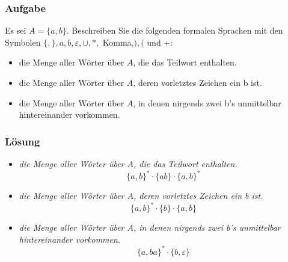 \begin{frame}
	\frametitle{Aufgabe }
	Es sei $A = \{a, b\}$. Beschreiben Sie die folgenden formalen Sprachen mit den Symbolen $\{, \}, a, b,
\varepsilon, \cup, \ast,$ Komma,$ ), ($ und $+$:
	\begin{itemize}
		\item die Menge aller Wörter über $A$, die das Teilwort  enthalten.
		\item die Menge aller Wörter über $A$, deren vorletztes Zeichen ein b ist.
		\item die Menge aller Wörter über $A$, in denen nirgends zwei b’s unmittelbar hintereinander vorkommen.
	\end{itemize}
\end{frame}

\begin{frame}
	\frametitle{Lösung}
	\begin{itemize}
		\item \textit{die Menge aller Wörter über $A$, die das Teilwort  enthalten.}  \pause
			$$\{a,b\}^\ast \cdot \{ab\} \cdot \{a,b\}^\ast$$ \pause
		\item \textit{die Menge aller Wörter über $A$, deren vorletztes Zeichen ein b ist.}  \pause
			$$\{a,b\}^\ast \cdot \{b\} \cdot \{a,b\}$$ \pause
		\item \textit{die Menge aller Wörter über $A$, in denen nirgends zwei b’s unmittelbar hintereinander vorkommen.}  \pause
			$$\{a, ba\}^\ast \cdot \{b, \varepsilon \}$$
	\end{itemize}
\end{frame}


